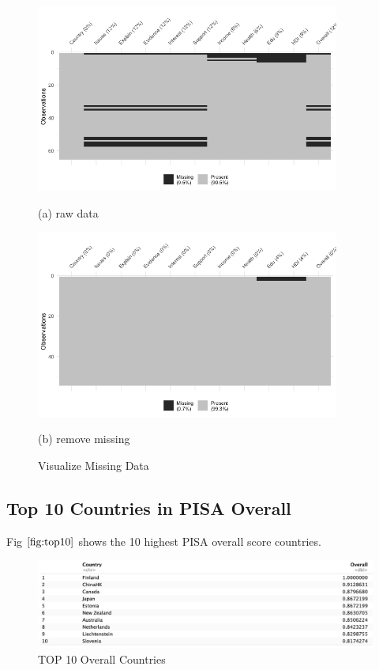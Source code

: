 \documentclass[12pt]{article}
\begin{document}
\begin{figure}[htb]
  \begin{minipage}[b]{1.0\linewidth}
    \centering
    \centerline{\includegraphics[width=10.0cm]{images/null_1}}
    \centerline{(a) raw data}\medskip
  \end{minipage}
  \hfill
  \begin{minipage}[b]{1.0\linewidth}
    \centering
    \centerline{\includegraphics[width=10.0cm]{images/null_2}}
    \centerline{(b) remove missing }\medskip
  \end{minipage}
  \caption{Visualize Missing Data}
  \label{fig:missing}
  \end{figure}

  \subsection{Top 10 Countries in PISA Overall}
  \label{ss.top10}

  Fig $\ref{fig:top10}$ shows the 10 highest PISA overall score countries.

  \begin{figure}[htb]
    \centering
    \includegraphics[width=\linewidth]{images/top10}
    \caption{TOP 10 Overall Countries}
    \label{fig:top10}
    \end{figure}
\end{document}
